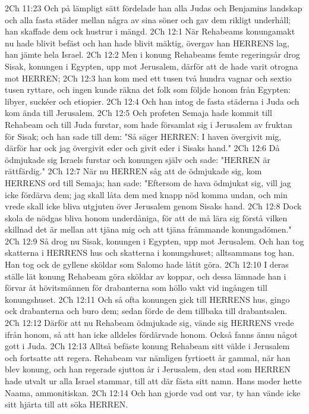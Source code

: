 2Ch 11:23  Och på lämpligt sätt fördelade han alla Judas och Benjamins landskap och alla fasta städer mellan några av sina söner och gav dem rikligt underhåll; han skaffade dem ock hustrur i mängd.
2Ch 12:1  När Rehabeams konungamakt nu hade blivit befäst och han hade blivit mäktig, övergav han HERRENS lag, han jämte hela Israel.
2Ch 12:2  Men i konung Rehabeams femte regeringsår drog Sisak, konungen i Egypten, upp mot Jerusalem, därför att de hade varit otrogna mot HERREN;
2Ch 12:3  han kom med ett tusen två hundra vagnar och sextio tusen ryttare, och ingen kunde räkna det folk som följde honom från Egypten: libyer, suckéer och etiopier.
2Ch 12:4  Och han intog de fasta städerna i Juda och kom ända till Jerusalem.
2Ch 12:5  Och profeten Semaja hade kommit till Rehabeam och till Juda furstar, som hade församlat sig i Jerusalem av fruktan för Sisak; och han sade till dem: "Så säger HERREN: I haven övergivit mig, därför har ock jag övergivit eder och givit eder i Sisaks hand."
2Ch 12:6  Då ödmjukade sig Israels furstar och konungen själv och sade: "HERREN är rättfärdig."
2Ch 12:7  När nu HERREN såg att de ödmjukade sig, kom HERRENS ord till Semaja; han sade: "Eftersom de hava ödmjukat sig, vill jag icke fördärva dem; jag skall låta dem med knapp nöd komma undan, och min vrede skall icke bliva utgjuten över Jerusalem genom Sisaks hand.
2Ch 12:8  Dock skola de nödgas bliva honom underdåniga, för att de må lära sig förstå vilken skillnad det är mellan att tjäna mig och att tjäna främmande konungadömen."
2Ch 12:9  Så drog nu Sisak, konungen i Egypten, upp mot Jerusalem. Och han tog skatterna i HERRENS hus och skatterna i konungshuset; alltsammans tog han. Han tog ock de gyllene sköldar som Salomo hade låtit göra.
2Ch 12:10  I deras ställe lät konung Rehabeam göra sköldar av koppar, och dessa lämnade han i förvar åt hövitsmännen för drabanterna som höllo vakt vid ingången till konungshuset.
2Ch 12:11  Och så ofta konungen gick till HERRENS hus, gingo ock drabanterna och buro dem; sedan förde de dem tillbaka till drabantsalen.
2Ch 12:12  Därför att nu Rehabeam ödmjukade sig, vände sig HERRENS vrede ifrån honom, så att han icke alldeles fördärvade honom. Också fanns ännu något gott i Juda.
2Ch 12:13  Alltså befäste konung Rehabeam sitt välde i Jerusalem och fortsatte att regera. Rehabeam var nämligen fyrtioett år gammal, när han blev konung, och han regerade sjutton år i Jerusalem, den stad som HERREN hade utvalt ur alla Israel stammar, till att där fästa sitt namn. Hans moder hette Naama, ammonitiskan.
2Ch 12:14  Och han gjorde vad ont var, ty han vände icke sitt hjärta till att söka HERREN.
